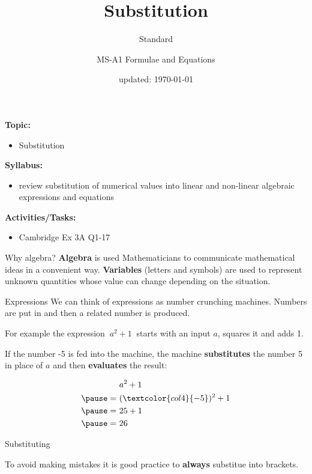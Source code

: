 \documentclass[aspectratio=1610,10pt]{beamer}
\title{Substitution}
\subtitle{Standard}
\author{MS-A1 Formulae and Equations}
\date{updated: \today
}
\begin{document}
\frame{\titlepage}

\begin{frame}
  \begin{outcome}
    \textbf{Topic:}
    \begin{itemize}
      \item[] Substitution
    \end{itemize}

    \textbf{Syllabus:}
    \begin{itemize}
      \item review substitution of numerical values into linear and non-linear algebraic expressions and equations
    \end{itemize}

    \textbf{Activities/Tasks:}
    \begin{itemize}
      \item Cambridge Ex 3A Q1-17
    \end{itemize}
  \end{outcome}
\end{frame}

\begin{frame}{Why algebra?}
  \pause
  \textbf{Algebra} is used Mathematicians to communicate mathematical ideas in a convenient way. \textbf{Variables} (letters and symbols) are used to represent unknown quantities whose value can change depending on the situation.
\end{frame}

\begin{frame}{Expressions}
  We can think of expressions as number crunching machines. Numbers are  put in and then a related number is produced.\pause

  For example the expression $\ a^2+1\ $ starts with an input $a$, squares it and adds 1.\pause

  If the number -5 is fed into the machine, the machine \textbf{substitutes} the number 5 in place of $a$ and then \textbf{evaluates} the result:\pause

  \[
    \begin{aligned}
         &a^2+1\\\pause
      =\ &(\textcolor{col4}{-5})^2+1\\\pause
      =\ &25+1\\\pause
      =\ &26
    \end{aligned}
    \]
\end{frame}

\begin{frame}{Substituting}
  \begin{important}
    To avoid making mistakes it is good practice to \textbf{always} substitue into brackets.
  \end{important}
\end{frame}
\end{document}
